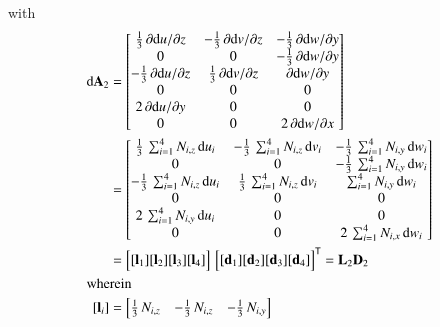 with  
\begin{subequations}
	\begin{align}
	\mathrm{d} \mathbf{A}_2 & =  \begin{bmatrix}
		\tfrac{1}{3} \, \partial \mathrm{d} u / \partial z &  - \tfrac{1}{3} \, \partial \mathrm{d} v / \partial z & - \tfrac{1}{3} \, \partial \mathrm{d} w / \partial y  \\
		0 & 0 & - \tfrac{1}{3} \, \partial \mathrm{d} w / \partial y  \\
		-\tfrac{1}{3} \, \partial \mathrm{d} u / \partial z  & \tfrac{1}{3} \, \partial \mathrm{d} v / \partial z & \partial \mathrm{d} w / \partial y \\
		0 & 0 & 0  \\
		2 \, \partial \mathrm{d} u / \partial y &  0 & 0 \\
		0 &  0 &  2 \, \partial \mathrm{d} w / \partial x  \end{bmatrix} \notag\\
	& = \begin{bmatrix}
	\tfrac{1}{3} \, \sum\nolimits_{i=1}^4 N_{i,z} \, \mathrm{d} u_i &  - \tfrac{1}{3} \, \sum\nolimits_{i=1}^4 N_{i,z} \, \mathrm{d} v_i & - \tfrac{1}{3} \, \sum\nolimits_{i=1}^4 N_{i,y} \, \mathrm{d} w_i  \\
	0 &  0 & - \tfrac{1}{3} \, \sum\nolimits_{i=1}^4 N_{i,y} \, \mathrm{d} w_i  \\
	-\tfrac{1}{3} \, \sum\nolimits_{i=1}^4 N_{i,z} \, \mathrm{d} u_i  & \tfrac{1}{3} \, \sum\nolimits_{i=1}^4 N_{i,z} \, \mathrm{d} v_i & \sum\nolimits_{i=1}^4 N_{i,y} \, \mathrm{d} w_i \\
	0 &  0 & 0  \\
	2 \, \sum\nolimits_{i=1}^4 N_{i,y} \, \mathrm{d} u_i &  0 & 0  \\
	0 &  0 &  2 \, \sum\nolimits_{i=1}^4 N_{i,x} \, \mathrm{d} w_i  \end{bmatrix} \notag \\	
	& = \begin{bmatrix}
	[\mathbf{l}_1] [\mathbf{l}_2] [\mathbf{l}_3] [\mathbf{l}_4] 
	\end{bmatrix}  \, \begin{bmatrix} [\mathbf{d}_1] [\mathbf{d}_2] [\mathbf{d}_3] [\mathbf{d}_4] \end{bmatrix}^{\mathsf{T}}
= \mathbf{L}_2 \mathbf{D}_2 \\
	\intertext{wherein}
	[\mathbf{l}_i] & = \begin{bmatrix}
		\tfrac{1}{3} \,  N_{i,z}  &  - \tfrac{1}{3} \,  N_{i,z}  & - \tfrac{1}{3} \,  N_{i,y}   \\

\end{bmatrix}
\end{align}
\end{subequations}
